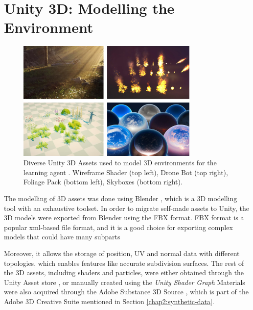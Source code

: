 
\newpage
\section{Unity 3D: Modelling the Environment}\label{appendix:unity3d-environment-modeling}
\begin{figure}[!ht]
        \centering
        \includegraphics[width=0.8\textwidth]{images/unity-assets.png}
        \caption{Diverse Unity 3D Assets used to model 3D environments for the learning agent \cite{unityAssetStore}. Wireframe Shader (top left), Drone Bot (top right), Foliage Pack (bottom left), Skyboxes (bottom right).
        }
        \label{fig:assets-unity}
\end{figure}
The modelling of 3D assets was done using Blender 
, which is a 3D modelling tool with an exhaustive toolset. In order to migrate self-made assets to Unity, the 3D models were exported from Blender using the FBX format. FBX format is a popular xml-based file format, and it is a good choice for exporting complex models that could have many subparts 

Moreover, it allows the storage of position, UV and normal data with different topologies, which enables features like accurate subdivision surfaces. 
The rest of the 3D assets, including shaders and particles, were either obtained through the Unity Asset store 
, or manually created using the \textit{Unity Shader Graph} 
Materials were also acquired through the Adobe Substance 3D Source \cite{}, which is part of the Adobe 3D Creative Suite mentioned in Section \ref{chap2:synthetic-data}. 


